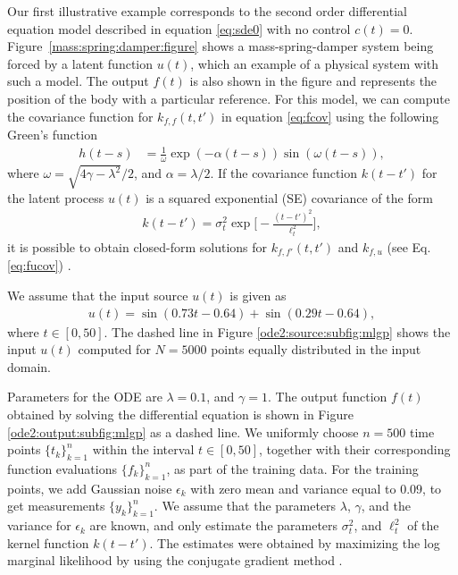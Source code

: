 \documentclass[journal]{IEEEtran}
\begin{document}
Our first illustrative example corresponds to the second order differential equation model described in equation
\eqref{eq:sde0} with no control $c(t) = 0$. Figure~\ref{mass:spring:damper:figure} shows a mass-spring-damper system
being forced by a latent function $u(t)$, which an example of a physical system with such a model. The output
$f(t)$ is also shown in the figure and represents the position of the body with a particular reference. For this model,
we can compute the covariance function for $k_{f,f}(t,t')$ in equation \eqref{eq:fcov} using the following Green's
function
\begin{align}\label{Greens:ODE:2}
h(t-s) & = \frac{1}{\omega}\exp(-\alpha(t-s))\sin(\omega(t-s)),
\end{align} 
where $\omega = \sqrt{4\gamma - \lambda^2}/2$, and $\alpha =
\lambda/2$. 
If the covariance function $k(t-t')$ for the latent process $u(t)$  is a squared exponential (SE) covariance of the form 
\begin{align*}
k(t -t') = \sigma_t^2\exp\Bigg[-\frac{(t-t')^2}{\ell^2_t}\Bigg],
\end{align*}
it is possible to obtain closed-form solutions for $k_{f,f'}(t,t')$ and $k_{f,u}$ (see Eq. \eqref{eq:fucov}) \cite{Alvarez+Luengo+Lawrence:2009}.
 
We assume that the input source $u(t)$ is given as
\begin{align*}
u(t) = \sin(0.73t - 0.64) + \sin(0.29t- 0.64),
\end{align*}
where $t\in [0,50]$. The dashed line in Figure \ref{ode2:source:subfig:mlgp}  shows the input $u(t)$ computed for
$N=5000$ points equally distributed in the input domain. 

Parameters for the ODE are $\lambda = 0.1$, and $\gamma = 1$. The output function $f(t)$ obtained by solving the
differential equation is shown in Figure \ref{ode2:output:subfig:mlgp} as a dashed line. 
We uniformly choose $n=500$ time points $\{t_k\}_{k=1}^n$ within the interval $t\in [0,50]$, together with their
corresponding function evaluations $\{f_k\}_{k=1}^n$, as part of the training data. For the training points, we add Gaussian noise
$\epsilon_k$ with zero mean and variance equal to $0.09$, to get
measurements $\{y_k\}_{k=1}^n$. We assume that the parameters
$\lambda$, $\gamma$, and the variance for $\epsilon_k$ are known, and
only estimate the parameters $\sigma_t^2$,
and $\ell^2_t$ of the kernel function $k(t-t')$. The estimates were obtained by maximizing the log marginal likelihood by using the conjugate gradient method \cite{Rasmussen+Williams:2006}.
\end{document}
